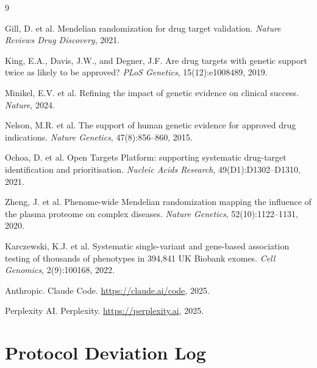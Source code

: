 \documentclass[11pt]{article}
\begin{document}
\begin{thebibliography}{9}

Gill, D. et al.
\newblock Mendelian randomization for drug target validation.
\newblock \emph{Nature Reviews Drug Discovery}, 2021.

King, E.A., Davis, J.W., and Degner, J.F.
\newblock Are drug targets with genetic support twice as likely to be approved?
\newblock \emph{PLoS Genetics}, 15(12):e1008489, 2019.

Minikel, E.V. et al.
\newblock Refining the impact of genetic evidence on clinical success.
\newblock \emph{Nature}, 2024.

Nelson, M.R. et al.
\newblock The support of human genetic evidence for approved drug indications.
\newblock \emph{Nature Genetics}, 47(8):856--860, 2015.

Ochoa, D. et al.
\newblock Open Targets Platform: supporting systematic drug-target identification and prioritisation.
\newblock \emph{Nucleic Acids Research}, 49(D1):D1302--D1310, 2021.

Zheng, J. et al.
\newblock Phenome-wide Mendelian randomization mapping the influence of the plasma proteome on complex diseases.
\newblock \emph{Nature Genetics}, 52(10):1122--1131, 2020.

Karczewski, K.J. et al.
\newblock Systematic single-variant and gene-based association testing of thousands of phenotypes in 394,841 UK Biobank exomes.
\newblock \emph{Cell Genomics}, 2(9):100168, 2022.

Anthropic.
\newblock Claude Code.
\newblock \url{https://claude.ai/code}, 2025.

Perplexity AI.
\newblock Perplexity.
\newblock \url{https://perplexity.ai}, 2025.

\end{thebibliography}

\clearpage
\appendix

\section{Protocol Deviation Log}
\label{app:deviation}
\end{document}
